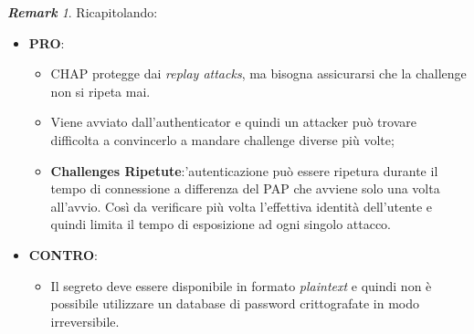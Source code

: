\documentclass{book}
\theoremstyle{remark}
\newtheorem*{remark}{\textbf{Remark}}
\begin{document}
\begin{remark}
	Ricapitolando:\begin{itemize}
		\item \textbf{PRO}:\begin{itemize}
			      \item CHAP protegge dai \emph{replay attacks}, ma bisogna assicurarsi che la challenge non si ripeta mai\@.
			      \item Viene avviato dall'authenticator e quindi un attacker può trovare difficolta a convincerlo a mandare challenge diverse più volte;\@
			      \item \textbf{Challenges Ripetute}:\@l'autenticazione può essere ripetura durante il tempo di connessione a differenza del PAP che avviene solo una volta all'avvio\@. Così da verificare più volta l'effettiva identità dell'utente e quindi limita il tempo di esposizione ad ogni singolo attacco\@.
		      \end{itemize}
		\item \textbf{CONTRO}:\begin{itemize}
			      \item Il segreto deve essere disponibile in formato \emph{plaintext} e quindi non è possibile utilizzare un database di password crittografate in modo irreversibile\@.
		      \end{itemize}
	\end{itemize}
\end{remark}
\end{document}
